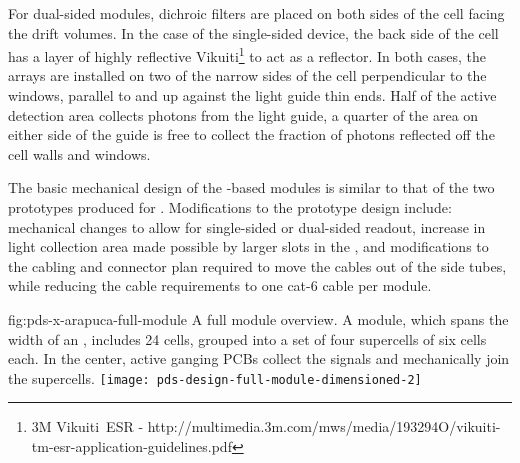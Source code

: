 For dual-sided  modules, dichroic filters are placed on both sides of the %
cell facing the 
drift volumes.  In the case of the single-sided device, the back side of the cell  %
has a layer of highly reflective Vikuiti\footnote{3M Vikuiti\texttrademark\  ESR - http://multimedia.3m.com/mws/media/193294O/vikuiti-tm-esr-application-guidelines.pdf} to act as %
a  reflector.  In both cases, the  arrays are installed on two of the narrow sides of the cell perpendicular to the windows, parallel to and up against the light guide thin ends. Half of the  active detection area collects photons from the light guide, a quarter of the area on either side of the guide is free to collect the fraction of photons reflected off the cell walls and windows. 

The basic mechanical design of the -based  modules  
is similar to that of the two prototypes produced for . Modifications to the prototype design include:  mechanical changes to allow for single-sided or dual-sided readout, increase in light collection area made possible by larger slots in the , and modifications to the cabling and connector plan required to move the  cables out of the  side tubes, while reducing the cable requirements to one cat-6 cable per  module.



\begin{dunefigure}
{fig:pds-x-arapuca-full-module}
{A full  module overview. A module, which spans the width of an , includes 24
  cells, grouped into a set of four supercells of six cells each. In the center, active ganging PCBs collect the signals and mechanically join the supercells.}
   \texttt{[image: pds-design-full-module-dimensioned-2]}
\end{dunefigure}


